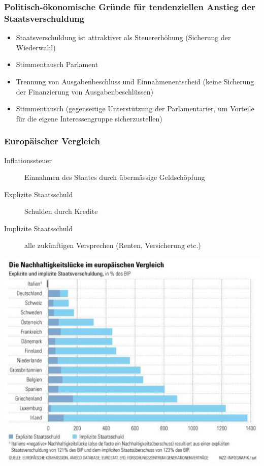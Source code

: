 \subsubsection{Politisch-ökonomische Gründe für tendenziellen Anstieg der Staatsverschuldung}
\begin{itemize}
	\item Staatsverschuldung ist attraktiver als Steuererhöhung (Sicherung der Wiederwahl)
	\item Stimmentausch Parlament
	\item Trennung von Ausgabenbeschluss und Einnahmenentscheid (keine Sicherung der Finanzierung von Ausgabenbeschlüssen)
	\item Stimmentausch (gegenseitige Unterstützung der Parlamentarier, um Vorteile für die eigene Interessengruppe sicherzustellen)
\end{itemize}

\subsubsection{Europäischer Vergleich}
\begin{multicols}{2}
	\begin{description}
		\item[Inflationssteuer] Einnahmen des Staates durch übermässige Geldschöpfung
		\item[Explizite Staatsschuld] Schulden durch Kredite
		\item[Implizite Staatsschuld] alle zukünftigen Versprechen (Renten, Versicherung etc.)
	\end{description}
	\vfill\null
	\includegraphics[width=\linewidth]{images/nachhaltigkeitsluecke.png}	
\end{multicols}
	
